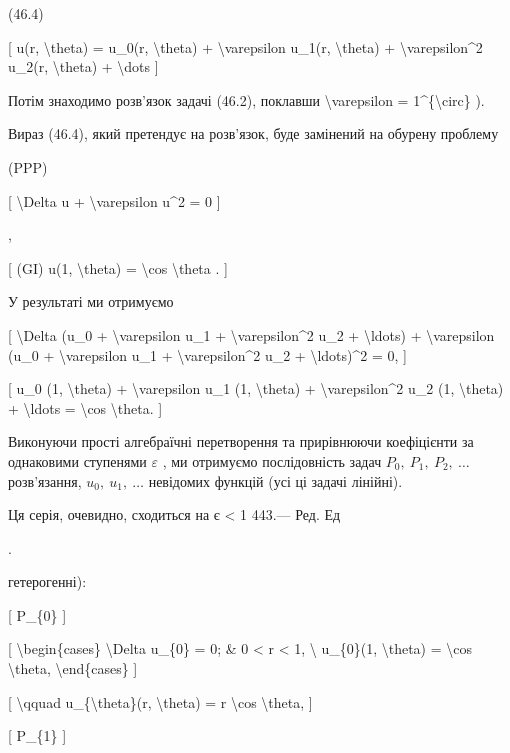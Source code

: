 \documentclass[
]{article}
\begin{document}
(46.4)

{[} u(r, \textbackslash theta) = u\_0(r, \textbackslash theta) +
\textbackslash varepsilon u\_1(r, \textbackslash theta) +
\textbackslash varepsilon\^{}2 u\_2(r, \textbackslash theta) +
\textbackslash dots {]}

Потім знаходимо розв'язок задачі (46.2), поклавши
\textbackslash varepsilon = 1\^{}\{\textbackslash circ\} ).

Вираз (46.4), який претендує на розв'язок, буде замінений на обурену
проблему

(PPP)

{[} \textbackslash Delta u + \textbackslash varepsilon u\^{}2 = 0 {]}

,

{[} (GI) u(1, \textbackslash theta) = \textbackslash cos
\textbackslash theta . {]}

У результаті ми отримуємо

{[} \textbackslash Delta (u\_0 + \textbackslash varepsilon u\_1 +
\textbackslash varepsilon\^{}2 u\_2 + \textbackslash ldots) +
\textbackslash varepsilon (u\_0 + \textbackslash varepsilon u\_1 +
\textbackslash varepsilon\^{}2 u\_2 + \textbackslash ldots)\^{}2 = 0,
{]}

{[} u\_0 (1, \textbackslash theta) + \textbackslash varepsilon u\_1 (1,
\textbackslash theta) + \textbackslash varepsilon\^{}2 u\_2 (1,
\textbackslash theta) + \textbackslash ldots = \textbackslash cos
\textbackslash theta. {]}

Виконуючи прості алгебраїчні перетворення та прирівнюючи коефіцієнти за
однаковими ступенями \(\varepsilon\) , ми отримуємо послідовність задач
\(P_0,\ P_1,\ P_2,\ \dots\) розв'язання, \(u_0,\ u_1,\ \dots\) невідомих
функцій (усі ці задачі лінійні).

Ця серія, очевидно, сходиться на \textbar{} є \textbar{} \textless{} 1
443.--- Ред. Ед

.

гетерогенні):

{[} P\_\{0\} {]}

{[} \textbackslash begin\{cases\} \textbackslash Delta u\_\{0\} = 0; \&
0 \textless{} r \textless{} 1, \textbackslash{} u\_\{0\}(1,
\textbackslash theta) = \textbackslash cos \textbackslash theta,
\textbackslash end\{cases\} {]}

{[} \textbackslash qquad u\_\{\textbackslash theta\}(r,
\textbackslash theta) = r \textbackslash cos \textbackslash theta, {]}

{[} P\_\{1\} {]}
\end{document}

